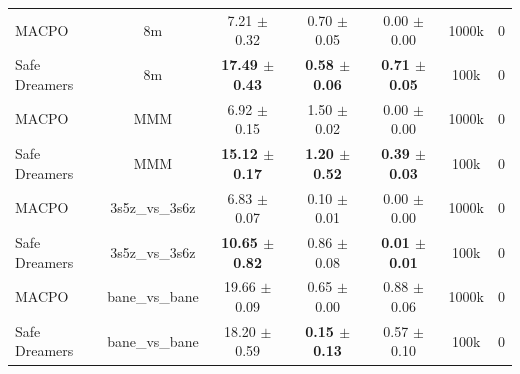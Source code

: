 \documentclass{article}
\begin{document}
\begin{longtable}{lcccccc}
\midrule
MACPO & 8m & 7.21 $\pm$ 0.32 & 0.70 $\pm$ 0.05 & 0.00 $\pm$ 0.00 & 1000k & 0 \\
Safe Dreamers & 8m & \textbf{17.49 $\pm$ 0.43} & \textbf{0.58 $\pm$ 0.06} & \textbf{0.71 $\pm$ 0.05} & 100k & 0 \\
\midrule
MACPO & MMM & 6.92 $\pm$ 0.15 & 1.50 $\pm$ 0.02 & 0.00 $\pm$ 0.00 & 1000k & 0 \\
Safe Dreamers & MMM & \textbf{15.12 $\pm$ 0.17} & \textbf{1.20 $\pm$ 0.52} & \textbf{0.39 $\pm$ 0.03} & 100k & 0 \\
\midrule
MACPO & 3s5z\_vs\_3s6z & 6.83 $\pm$ 0.07 & 0.10 $\pm$ 0.01 & 0.00 $\pm$ 0.00 & 1000k & 0 \\
Safe Dreamers & 3s5z\_vs\_3s6z & \textbf{10.65 $\pm$ 0.82} & 0.86 $\pm$ 0.08 & \textbf{0.01 $\pm$ 0.01} & 100k & 0 \\
\midrule
MACPO & bane\_vs\_bane & 19.66 $\pm$ 0.09 & 0.65 $\pm$ 0.00 & 0.88 $\pm$ 0.06 & 1000k & 0 \\
Safe Dreamers & bane\_vs\_bane & 18.20 $\pm$ 0.59 & \textbf{0.15 $\pm$ 0.13} & 0.57 $\pm$ 0.10 & 100k & 0 \\
\end{longtable}
\end{document}
